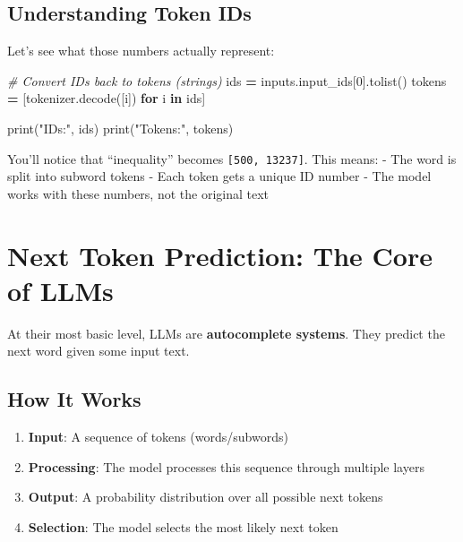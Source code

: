 \documentclass[
]{book}
\newenvironment{Shaded}{\begin{snugshade}}{\end{snugshade}}
\newcommand{\BuiltInTok}[1]{#1}
\newcommand{\CommentTok}[1]{\textcolor[rgb]{0.56,0.35,0.01}{\textit{#1}}}
\newcommand{\ControlFlowTok}[1]{\textcolor[rgb]{0.13,0.29,0.53}{\textbf{#1}}}
\newcommand{\DecValTok}[1]{\textcolor[rgb]{0.00,0.00,0.81}{#1}}
\newcommand{\KeywordTok}[1]{\textcolor[rgb]{0.13,0.29,0.53}{\textbf{#1}}}
\newcommand{\NormalTok}[1]{#1}
\newcommand{\OperatorTok}[1]{\textcolor[rgb]{0.81,0.36,0.00}{\textbf{#1}}}
\newcommand{\StringTok}[1]{\textcolor[rgb]{0.31,0.60,0.02}{#1}}
\providecommand{\tightlist}{%
  \setlength{\itemsep}{0pt}\setlength{\parskip}{0pt}}
\begin{document}
\subsection{Understanding Token IDs}\label{understanding-token-ids}

Let's see what those numbers actually represent:

\begin{Shaded}
\begin{Highlighting}[]
\CommentTok{\# Convert IDs back to tokens (strings)}
\NormalTok{ids }\OperatorTok{=}\NormalTok{ inputs.input\_ids[}\DecValTok{0}\NormalTok{].tolist()}
\NormalTok{tokens }\OperatorTok{=}\NormalTok{ [tokenizer.decode([i]) }\ControlFlowTok{for}\NormalTok{ i }\KeywordTok{in}\NormalTok{ ids]}

\BuiltInTok{print}\NormalTok{(}\StringTok{"IDs:"}\NormalTok{, ids)}
\BuiltInTok{print}\NormalTok{(}\StringTok{"Tokens:"}\NormalTok{, tokens)}
\end{Highlighting}
\end{Shaded}

You'll notice that ``inequality'' becomes \texttt{{[}500,\ 13237{]}}. This means:
- The word is split into subword tokens
- Each token gets a unique ID number
- The model works with these numbers, not the original text

\section{Next Token Prediction: The Core of LLMs}\label{next-token-prediction-the-core-of-llms}

At their most basic level, LLMs are \textbf{autocomplete systems}. They predict the next word given some input text.

\subsection{How It Works}\label{how-it-works}

\begin{enumerate}
\def\labelenumi{\arabic{enumi}.}
\tightlist
\item
  \textbf{Input}: A sequence of tokens (words/subwords)
\item
  \textbf{Processing}: The model processes this sequence through multiple layers
\item
  \textbf{Output}: A probability distribution over all possible next tokens
\item
  \textbf{Selection}: The model selects the most likely next token
\end{enumerate}
\end{document}
